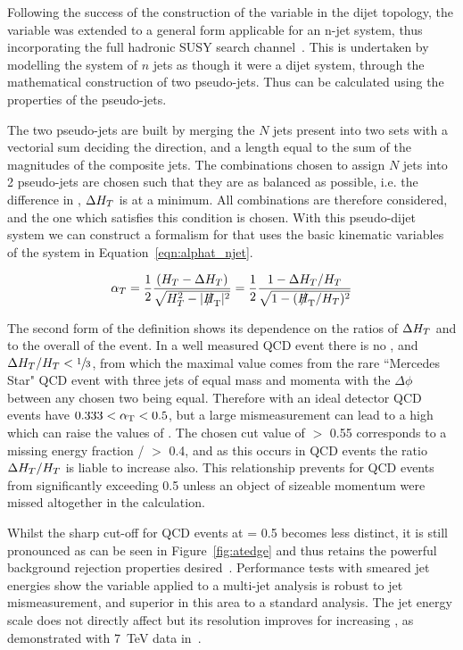 Following the success of the construction of the \alt variable in the dijet topology, the variable was extended to a general form applicable for an n-jet system, thus incorporating the full hadronic SUSY search channel~\cite{ANnaT}. This is undertaken by modelling the system of $n$ jets as though it were a dijet system, through the mathematical construction of two pseudo-jets. Thus \alt can be calculated using the properties of the pseudo-jets. 

The two pseudo-jets are built by merging the $N$ jets present into two sets with a vectorial sum deciding the direction, and a length equal to the sum of the magnitudes of the composite jets. The combinations chosen to assign $N$ jets into 2 pseudo-jets are chosen such that they are as balanced as possible, i.e. the difference in \HT, $\Delta H_{T}$ is at a minimum. All combinations are therefore considered, and the one which satisfies this condition is chosen. With this pseudo-dijet system we can construct a formalism for \alt that uses the basic kinematic variables of the system in Equation~\ref{eqn:alphat_njet}. 

\begin{equation}
\alpha_{T} =\frac{1}{2} \frac{(\HT - \Delta \HT)}{\sqrt{\HT^{2} - |\mht|^{2}}}  = \frac{1}{2} \frac{1-\Delta \HT / \HT}{\sqrt{1 - (\mht / \HT)^{2}}}
\label{eqn:alphat_njet}
\end{equation}

The second form of the definition shows its dependence on the ratios of $\Delta H_{T}$ and \mht to the overall \HT of the event. In a well measured QCD event there is no \mht, and $\Delta H_{T} / H_{T} < \sfrac{1}{3}$, from which the maximal value comes from the rare ``Mercedes Star" QCD event with three jets of equal mass and momenta with the $\Delta \phi$ between any chosen two being equal. Therefore with an ideal detector QCD events have $0.333 < \alpha_{\text{T}} < 0.5$, but a large mismeasurement can lead to a high \mht which can raise the values of \alt. The chosen cut value of \alt $>$ 0.55 corresponds to a missing energy fraction \mht / \HT $>$ 0.4, and as this occurs in QCD events the ratio $\Delta H_{T} / H_{T}$ is liable to increase also. This relationship prevents \alt for QCD events from significantly exceeding 0.5 unless an object of sizeable momentum were missed altogether in the calculation. 

Whilst the sharp cut-off for QCD events at \alt = 0.5 becomes less distinct, it is still pronounced as can be seen in Figure~\ref{fig:atedge} and thus retains the powerful background rejection properties desired~\cite{an2009_56}. Performance tests with smeared jet energies show the \alt variable applied to a multi-jet analysis is robust to jet mismeasurement, and superior in this area to a standard \met analysis. The jet energy scale does not directly affect \alt but its resolution improves for increasing \HT, as demonstrated with 7~TeV data in~\cite{an2010_119}. 

